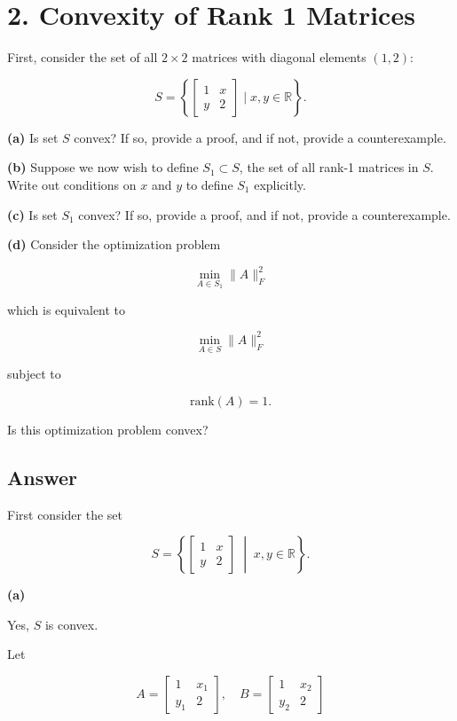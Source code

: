 \documentclass[
  12pt,
]{fphw}
\begin{document}
\section*{2. Convexity of Rank 1 Matrices}

First, consider the set of all $2\times2$ matrices with diagonal elements $(1,2)$:

\[
S = \left\{ \begin{bmatrix} 1 & x\\ y & 2 \end{bmatrix} \mid x,y\in\mathbb{R} \right\}.  \tag{12}
\]

\textbf{(a)} Is set $S$ convex? If so, provide a proof, and if not, provide a counterexample.

\textbf{(b)} Suppose we now wish to define $S_1\subset S$, the set of all rank-1 matrices in $S$. Write out conditions on $x$ and $y$ to define $S_1$ explicitly.

\textbf{(c)} Is set $S_1$ convex? If so, provide a proof, and if not, provide a counterexample.

\textbf{(d)} Consider the optimization problem

\[
\min_{A\in S_1} \|A\|_F^2 \tag{13}
\]

which is equivalent to

\[
\min_{A\in S} \|A\|_F^2 \tag{14}
\]

subject to

\[
\text{rank}(A)=1.  \tag{15}
\]

Is this optimization problem convex?

\subsection*{Answer}

First consider the set

\[
S =
\left\{
\begin{bmatrix}
1 & x \\
y & 2
\end{bmatrix}
\;\middle|\;
x,y \in \mathbb{R}
\right\}.
\]

\textbf{(a)}

Yes, $S$ is convex.

Let

\[
A =
\begin{bmatrix}
1 & x_1 \\
y_1 & 2
\end{bmatrix},
\quad
B =
\begin{bmatrix}
1 & x_2 \\
y_2 & 2
\end{bmatrix}
\]
\end{document}
